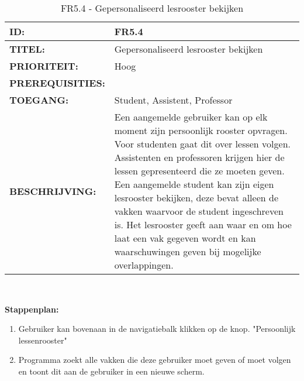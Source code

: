 \noindent\begin{table}[H]
            \begin{tabular}{l | p{10cm}}
                \textbf{ID:} & FR5.4 \\ \hline
                \textbf{TITEL:} & Gepersonaliseerd lesrooster bekijken\\ \hline
                \textbf{PRIORITEIT:} &  Hoog \\ \hline
                \textbf{PREREQUISITIES:} & \\ \hline
                \textbf{TOEGANG:} &  Student, Assistent, Professor \\ \hline
                \textbf{BESCHRIJVING:} & Een aangemelde gebruiker kan op elk moment zijn persoonlijk rooster opvragen. Voor studenten gaat dit over lessen volgen. Assistenten en professoren krijgen hier de lessen gepresenteerd die ze moeten geven. Een aangemelde student kan zijn eigen lesrooster bekijken, deze bevat alleen de vakken waarvoor de student ingeschreven is. 
                                        Het lesrooster geeft aan waar en om hoe laat een vak gegeven wordt en kan waarschuwingen geven bij mogelijke overlappingen.\\ 
            \end{tabular}\\
            \caption{FR5.4  - Gepersonaliseerd lesrooster bekijken}
            \label{tab:FR5.4 - Gepersonaliseerd lesrooster bekijken}
        \end{table}

\textbf{Stappenplan:}
	\begin{enumerate}
	\item Gebruiker kan bovenaan in de navigatiebalk klikken op de knop. "Persoonlijk lessenrooster"
	\item Programma zoekt alle vakken die deze gebruiker moet geven of moet volgen en toont dit aan de gebruiker in een nieuwe scherm.
	\end{enumerate}


